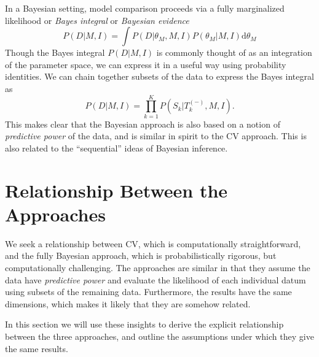 \documentclass[12pt]{article}
\newcommand{\dd}{\mathrm{d}}
\newcommand{\Tkminus}{\ensuremath{T_k^{(-)}}}
\begin{document}
In a Bayesian setting, model comparison proceeds via a fully marginalized
likelihood or {\it Bayes integral} or {\it Bayesian evidence}
\begin{equation}
  P(D|M,I) = \int P(D|\theta_M,M,I) P(\theta_M|M,I)\dd\theta_M
\end{equation}
Though the Bayes integral $P(D|M,I)$ is commonly thought of as an
integration of the parameter space, we can express it in a useful way
using probability identities.  We can chain together subsets of the
data to express the Bayes integral as
\begin{equation}
  \label{eq:bayes_chain}
  P(D|M,I) = \prod_{k=1}^K P(S_k|\Tkminus,M,I).
\end{equation}
This makes clear that the Bayesian approach is also based on a notion of
{\it predictive power} of the data, and is similar in spirit to
the CV approach.  This is also related to the ``sequential'' ideas
of Bayesian inference.

\section{Relationship Between the Approaches}
We seek a relationship between CV, which is computationally straightforward,
and the fully Bayesian approach, which is probabilistically rigorous, but
computationally challenging.  The approaches are similar in that they assume
the data have {\it predictive power} and evaluate the likelihood of each
individual datum using subsets of the remaining data.  Furthermore, the
results have the same dimensions, which makes it likely that they are
somehow related.

In this section we will use these insights to derive the explicit
relationship between the three approaches, and outline the assumptions
under which they give the same results.
\end{document}
